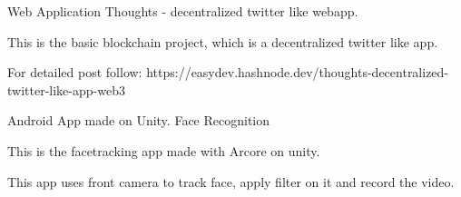 

\begin{cventries}

 
    \cventry
    {Web Application} %
    {Thoughts - decentralized twitter like webapp.} %
    {} %
    {} %
    {
      \begin{cvitems} %
        \item {This is the basic blockchain project, which is a decentralized twitter like app. }
        \item {For detailed post follow: https://easydev.hashnode.dev/thoughts-decentralized-twitter-like-app-web3}
      \end{cvitems}
    }

 
  \cventry
    {Android App made on Unity.} %
    {Face Recognition} %
    {} %
    {} %
    {
      \begin{cvitems} %
        \item {This is the facetracking app made with Arcore on unity. }
        \item {This app uses front camera to track face, apply filter on it and record the video.}
      \end{cvitems}
    }


    

\end{cventries}
